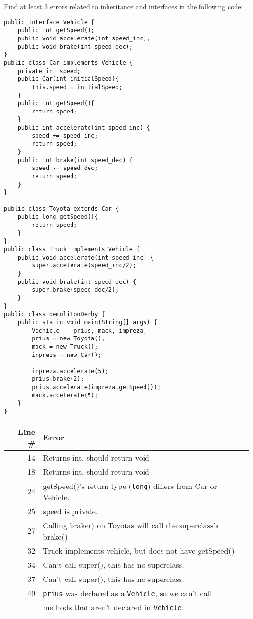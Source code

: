 Find at least 3 errors related to inheritance and interfaces in the following code:\label{demolition-derby}
\begin{lstlisting}
public interface Vehicle {
	public int getSpeed();
	public void accelerate(int speed_inc);
	public void brake(int speed_dec);
}
public class Car implements Vehicle {
	private int speed;
	public Car(int initialSpeed){
		this.speed = initialSpeed;
	}
	public int getSpeed(){
		return speed;
	}
	public int accelerate(int speed_inc) {
		speed += speed_inc;
		return speed;
	}
	public int brake(int speed_dec) {
		speed -= speed_dec;
		return speed;
	}
}

public class Toyota extends Car {
	public long getSpeed(){
		return speed;
	}
}
public class Truck implements Vehicle {
	public void accelerate(int speed_inc) {
		super.accelerate(speed_inc/2);
	}
	public void brake(int speed_dec) {
		super.brake(speed_dec/2);
	}
}
public class demolitonDerby {
	public static void main(String[] args) {
		Vechicle	prius, mack, impreza;
		prius = new Toyota();
		mack = new Truck();
		impreza = new Car();
		
		impreza.accelerate(5);
		prius.brake(2);
		prius.accelerate(impreza.getSpeed());
		mack.accelerate(5);
	}
}
\end{lstlisting}

\begin{answer}
    \begin{tabular}{r l} %
    Line \# & Error \\\hline
    14  	& Returns int, should return void\\
    18  	& Returns int, should return void\\
    24  	& getSpeed()'s return type ({\tt long}) differs from Car or Vehicle.\\
    25  	& speed is private.\\
    27		& Calling brake() on Toyotas will call the superclass's brake()\\
    32  	& Truck implements vehicle, but does not have getSpeed()\\
    34  	& Can't call super(), this has no superclass.\\
    37  	& Can't call super(), this has no superclass.\\
    49  	& {\tt prius} was declared as a {\tt Vehicle}, so we can't call\\
    ~  		& methods that aren't declared in {\tt Vehicle}.\\
    \end{tabular}
\end{answer}